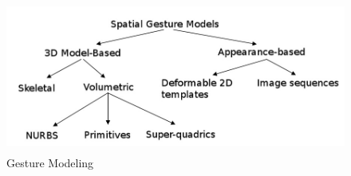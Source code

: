 \begin{figure}
	[h] \centering 
	\includegraphics[height=5cm]{figures/content/ges-model.jpg} \caption{Gesture Modeling} \label{fg:ges:model} 
\end{figure}
